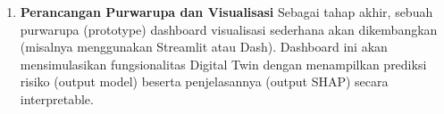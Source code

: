 \begin{enumerate}
    \item \textbf{Perancangan Purwarupa dan Visualisasi}
    Sebagai tahap akhir, sebuah purwarupa (prototype) dashboard visualisasi sederhana akan dikembangkan (misalnya menggunakan Streamlit atau Dash). Dashboard ini akan mensimulasikan fungsionalitas Digital Twin dengan menampilkan prediksi risiko (output model) beserta penjelasannya (output SHAP) secara interpretable.
\end{enumerate}
